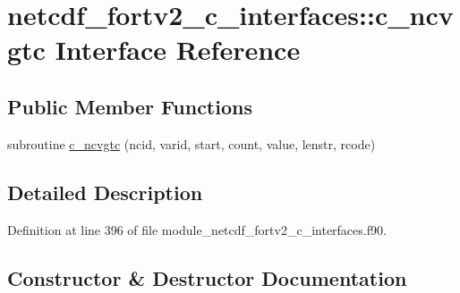 \hypertarget{interfacenetcdf__fortv2__c__interfaces_1_1c__ncvgtc}{}\section{netcdf\+\_\+fortv2\+\_\+c\+\_\+interfaces\+:\+:c\+\_\+ncvgtc Interface Reference}
\label{interfacenetcdf__fortv2__c__interfaces_1_1c__ncvgtc}
\subsection*{Public Member Functions}
\begin{DoxyCompactItemize}
\item 
subroutine \hyperlink{interfacenetcdf__fortv2__c__interfaces_1_1c__ncvgtc_a1d73cdb6c657bf08a35fd57d74fd3eae}{c\+\_\+ncvgtc} (ncid, varid, start, count, value, lenstr, rcode)
\end{DoxyCompactItemize}


\subsection{Detailed Description}


Definition at line 396 of file module\+\_\+netcdf\+\_\+fortv2\+\_\+c\+\_\+interfaces.\+f90.



\subsection{Constructor \& Destructor Documentation}
\mbox{\label{interfacenetcdf__fortv2__c__interfaces_1_1c__ncvgtc_a1d73cdb6c657bf08a35fd57d74fd3eae}} 
